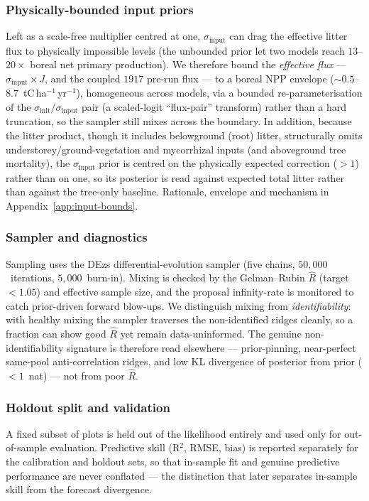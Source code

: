 \documentclass[11pt]{article}
\begin{document}
\subsubsection{Physically-bounded input priors}
Left as a scale-free multiplier centred at one, $\sigma_{\mathrm{input}}$ can
drag the effective litter flux to physically impossible levels (the unbounded
prior let two models reach $13$--$20\times$ boreal net primary production). We
therefore bound the \emph{effective flux} --- $\sigma_{\mathrm{input}}\times J$,
and the coupled $1917$ pre-run flux --- to a boreal NPP envelope
($\sim\!0.5$--$8.7$~tC\,ha$^{-1}$\,yr$^{-1}$), homogeneous across models, via a
bounded re-parameterisation of the $\sigma_{\mathrm{init}}/\sigma_{\mathrm{input}}$
pair (a scaled-logit ``flux-pair'' transform) rather than a hard truncation, so
the sampler still mixes across the boundary. In addition, because the litter
product, though it includes belowground (root) litter, structurally omits
understorey/ground-vegetation and mycorrhizal inputs (and aboveground tree
mortality), the $\sigma_{\mathrm{input}}$ prior is centred on the physically
expected correction ($>1$) rather than on one, so its posterior is read against
expected total litter rather than against the tree-only baseline.
Rationale, envelope and mechanism in Appendix~\ref{app:input-bounds}.

\subsubsection{Sampler and diagnostics}
Sampling uses the DEzs differential-evolution sampler (five chains,
$50{,}000$~iterations, $5{,}000$~burn-in). Mixing is checked by the
Gelman--Rubin $\hat{R}$ (target $<1.05$) and effective sample size, and the
proposal infinity-rate is monitored to catch prior-driven forward blow-ups. We
distinguish mixing from \emph{identifiability}: with healthy mixing the sampler
traverses the non-identified ridges cleanly, so a fraction can show good
$\hat{R}$ yet remain data-uninformed. The genuine non-identifiability signature
is therefore read elsewhere --- prior-pinning, near-perfect same-pool
anti-correlation ridges, and low KL divergence of posterior from prior
($<1$~nat) --- not from poor $\hat{R}$.

\subsubsection{Holdout split and validation}
A fixed subset of plots is held out of the likelihood entirely and used only for
out-of-sample evaluation. Predictive skill (R$^2$, RMSE, bias) is reported
separately for the calibration and holdout sets, so that in-sample fit and
genuine predictive performance are never conflated --- the distinction that
later separates in-sample skill from the forecast divergence.
\end{document}
